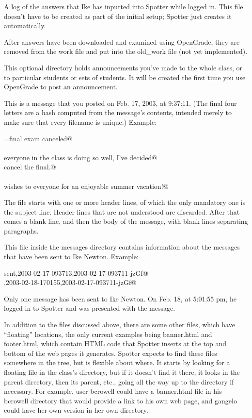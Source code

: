 \documentclass{doc}
\begin{document}
 A log of the answers that Ike has inputted into Spotter
while logged in. This file doesn't have to be created as part of the initial setup; Spotter just creates it automatically.

 After answers have been downloaded and examined using OpenGrade,
they are removed from the work file and put into the old\_work file (not yet
implemented).

This optional directory holds announcements you've made to the whole class, or to particular
students or sets of students. It will be created the first time you use OpenGrade to post
an announcement.

 This is a message that you posted on Feb. 17, 2003, at 9:37:11.
(The final four letters are a hash computed from the message's contents, intended merely to
make sure that every filename is unique.)
Example:

\verb@subject=final exam canceled@\\
\verb@@\\
\verb@Since everyone in the class is doing so well, I've decided@\\
\verb@to cancel the final.@\\
\verb@@\\
\verb@Best wishes to everyone for an enjoyable summer vacation!@

The file starts with one or more header lines, of which the only mandatory one is
the subject line. Header lines that are not understood are discarded. After that
comes a blank line, and then the body of the message, with blank lines separating
paragraphs.

 This file inside the messages directory contains information about
the messages that have been sent to Ike Newton. Example:

\verb@    sent,2003-02-17-093713,2003-02-17-093711-jzGf@\\
\verb@received,2003-02-18-170155,2003-02-17-093711-jzGf@

Only one message has been sent to Ike Newton. On Feb. 18, at 5:01:55 pm, he logged in
to Spotter and was presented with the message.

In addition to the files discussed above, there are some other files, which
have ``floating'' locations, the only current examples being banner.html and footer.html, which contain
HTML code that Spotter inserts at the top and bottom of the web pages it generates. Spotter
expects to find these files somewhere in the tree, but is flexible about where. It starts by looking 
for a floating file in the class's
directory, but if it doesn't find it there, it looks in the parent directory, then its parent, etc., going all the way
up to the \verb@spotter@ directory if necessary. For example, user bcrowell could have a banner.html file
in his bcrowell directory that would provide a link to his own web page, and gangelo could have her
own version in her own directory.
\end{document}
